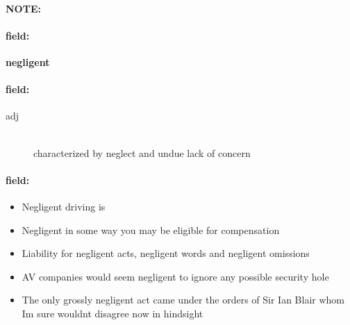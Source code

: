 \documentclass[12pt]{article}
\newenvironment{note}{\paragraph{NOTE:}}{}
\newenvironment{field}{\paragraph{field:}}{}
\begin{document}
\begin{note}
\begin{field}
\textbf{\large negligent}
\end{field}


\begin{field}
\begin{description}
\item[adj] \hfill \\ 
characterized by neglect and undue lack of concern

\end{description}
\end{field}

\begin{field}
\begin{itemize}
\item Negligent driving is
\item Negligent in some way you may be eligible for compensation
\item Liability for negligent acts, negligent words and negligent omissions
\item AV companies would seem negligent to ignore any possible security hole
\item The only grossly negligent act came under the orders of Sir Ian Blair whom Im sure wouldnt disagree now in hindsight
\end{itemize}
\end{field}
\end{note}
\end{document}
